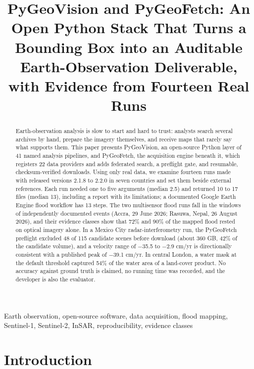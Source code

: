 \documentclass[conference]{IEEEtran}
\begin{document}
\title{PyGeoVision and PyGeoFetch: An Open Python Stack That Turns a Bounding Box into an Auditable Earth-Observation Deliverable, with Evidence from Fourteen Real Runs}
\author{
}
\maketitle
\begin{abstract}
Earth-observation analysis is slow to start and hard to trust: analysts search several archives by hand, prepare the imagery themselves, and receive maps that rarely say what supports them. This paper presents PyGeoVision, an open-source Python layer of 41 named analysis pipelines, and PyGeoFetch, the acquisition engine beneath it, which registers 22 data providers and adds federated search, a preflight gate, and resumable, checksum-verified downloads. Using only real data, we examine fourteen runs made with released versions 2.1.8 to 2.2.0 in seven countries and set them beside external references. Each run needed one to five arguments (median 2.5) and returned 10 to 17 files (median 13), including a report with its limitations; a documented Google Earth Engine flood workflow has 13 steps. The two multisensor flood runs fall in the windows of independently documented events (Accra, 29 June 2026; Rasuwa, Nepal, 26 August 2026), and their evidence classes show that 72\% and 90\% of the mapped flood rested on optical imagery alone. In a Mexico City radar-interferometry run, the PyGeoFetch preflight excluded 48 of 115 candidate scenes before download (about 360 GB, 42\% of the candidate volume), and a velocity range of $-$35.5 to $-$2.9 cm/yr is directionally consistent with a published peak of $-$39.1 cm/yr. In central London, a water mask at the default threshold captured 54\% of the water area of a land-cover product. No accuracy against ground truth is claimed, no running time was recorded, and the developer is also the evaluator.
\end{abstract}
\begin{IEEEkeywords}
Earth observation, open-source software, data acquisition, flood mapping, Sentinel-1, Sentinel-2, InSAR, reproducibility, evidence classes
\end{IEEEkeywords}
\section{Introduction}
\end{document}
